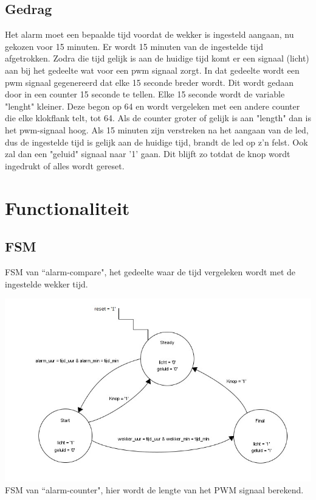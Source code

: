 \subsection{Gedrag}
Het alarm moet een bepaalde tijd voordat de wekker is ingesteld aangaan, nu gekozen voor 15 minuten.
Er wordt 15 minuten van de ingestelde tijd afgetrokken. Zodra die tijd gelijk is aan de huidige tijd komt er een signaal (licht) aan bij het gedeelte wat voor een pwm signaal zorgt.
In dat gedeelte wordt een pwm signaal gegenereerd dat elke 15 seconde breder wordt. Dit wordt gedaan door in een counter 15 seconde te tellen. Elke 15 seconde wordt de variable "lenght" kleiner. Deze begon op 64 en wordt vergeleken met een andere counter die elke klokflank telt, tot 64. Als de counter groter of gelijk is aan "length" dan is het pwm-signaal hoog. 
Als 15 minuten zijn verstreken na het aangaan van de led, dus de ingestelde tijd is gelijk aan de huidige tijd, brandt de led op z'n felst. Ook zal dan een "geluid" signaal naar '1' gaan. Dit blijft zo totdat de knop wordt ingedrukt of alles wordt gereset.
\newpage
\section{Functionaliteit}
\subsection{FSM}
FSM van ``alarm-compare", het gedeelte waar de tijd vergeleken wordt met de ingestelde wekker tijd.

\includegraphics[width=\textwidth,height=\textheight,keepaspectratio]{Figuren/Alarm/FSM_compare.jpg}
FSM van ``alarm-counter", hier wordt de lengte van het PWM signaal berekend.

